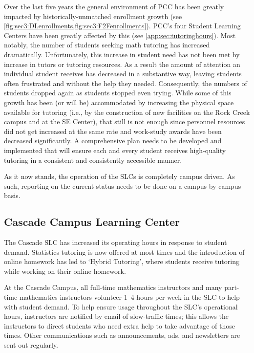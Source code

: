 Over the last five years the general environment of PCC has been greatly
impacted by historically-unmatched enrollment growth (see \vref{fig:sec3:DLenrollments,fig:sec3:F2Fenrollments}). PCC's four Student
Learning Centers have been greatly affected by this (see \vref{app:sec:tutoringhours}).  
Most notably, the number of students seeking math tutoring has
increased dramatically.  Unfortunately, this increase in student need has not
been met by increase in tutors or tutoring resources.  As a result the
amount of attention an individual student receives has decreased in a
substantive way, leaving students often frustrated and without the help they needed. Consequently, the numbers of students dropped again as students stopped even trying.   While some of this growth has been (or will be) accommodated
by increasing the physical space available for tutoring (i.e., by the
construction of new facilities on the Rock Creek campus and at the SE Center),
that still is not enough since personnel resources did not get increased at the same rate and work-study awards have been decreased significantly.  A comprehensive plan needs to be developed and implemented that will ensure each and every student receives high-quality tutoring in a consistent and consistently accessible manner.

As it now stands, the operation of the SLCs is completely campus driven.  As
such, reporting on the current status needs to be done on a campus-by-campus
basis.

\subsection{Cascade Campus Learning Center}
The Cascade SLC has increased its operating hours in response to student
demand. Statistics tutoring is now offered at most times and the introduction of
online homework has led to `Hybrid Tutoring', where students receive tutoring
while working on their online homework. 

At the Cascade Campus, all full-time mathematics instructors and many part-time
mathematics instructors volunteer 1--4 hours per week in the SLC to help with
student demand. To help ensure usage throughout the SLC's operational hours,
instructors are notified by email of slow-traffic times; this allows the
instructors to direct students who need extra help to take advantage of those
times. Other communications such as announcements, ads, and newsletters are
sent out regularly.

